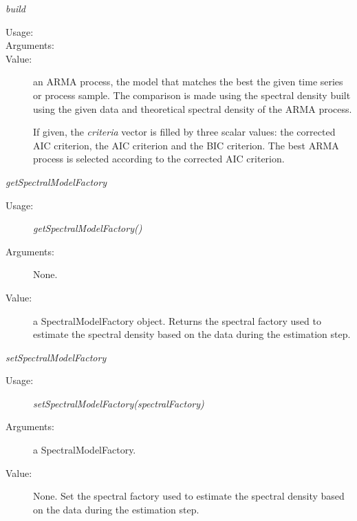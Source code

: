 \begin{description}
\begin{description}
\item \textit{build}
\begin{description}
\item[Usage:]
\item[Arguments:]
\item[Value:] an ARMA process, the model that matches the best the given time series or process sample. The comparison is made using the spectral density built using the given data and theoretical spectral density of the ARMA process.

If given, the \textit{criteria} vector is filled by three scalar values: the corrected AIC criterion, the AIC criterion and the BIC criterion. The best ARMA process is selected according to the corrected AIC criterion.
\end{description}
\bigskip

\item \textit{getSpectralModelFactory}
\begin{description}
\item[Usage:] \textit{getSpectralModelFactory()}
\item[Arguments:] None.
\item[Value:] a SpectralModelFactory object. Returns the spectral factory used to estimate the spectral density based on the data during the estimation step.
\end{description}
\bigskip

\item \textit{setSpectralModelFactory}
\begin{description}
\item[Usage:] \textit{setSpectralModelFactory(spectralFactory)}
\item[Arguments:] a SpectralModelFactory.
\item[Value:] None. Set the spectral factory used to estimate the spectral density based on the data during the estimation step.
\end{description}
\bigskip


\end{description}
\end{description}
